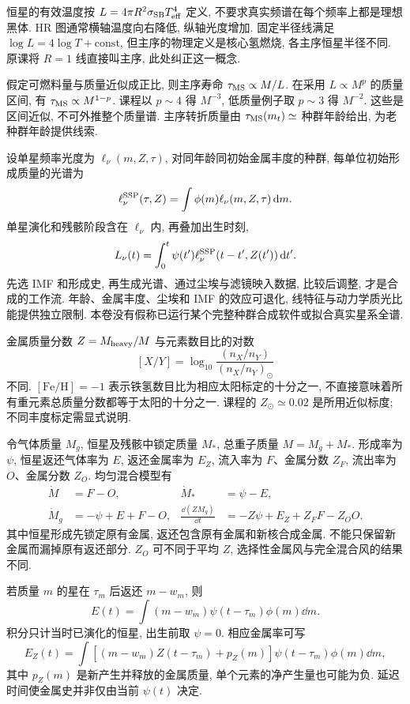 恒星的有效温度按 $L=4\pi R^2\sigma_{\rm SB}T_{\rm eff}^4$ 定义, 不要求真实频谱在每个频率上都是理想黑体. HR 图通常横轴温度向右降低, 纵轴光度增加. 固定半径线满足 $\log L=4\log T+\mathrm{const}$, 但主序的物理定义是核心氢燃烧, 各主序恒星半径不同. 原课将 $R=1$ 线直接叫主序, 此处纠正这一概念.

假定可燃料量与质量近似成正比, 则主序寿命 $\tau_{\rm MS}\propto M/L$. 在采用 $L\propto M^p$ 的质量区间, 有 $\tau_{\rm MS}\propto M^{1-p}$. 课程以 $p\sim4$ 得 $M^{-3}$, 低质量例子取 $p\sim3$ 得 $M^{-2}$. 这些是区间近似, 不可外推整个质量谱. 主序转折质量由 $\tau_{
\rm MS}(m_t)\simeq$ 种群年龄给出, 为老种群年龄提供线索.

设单星频率光度为 $\ell_\nu(m,Z,\tau)$, 对同年龄同初始金属丰度的种群, 每单位初始形成质量的光谱为
\[
\ell_\nu^{\rm SSP}(\tau,Z)=\int\phi(m)\ell_\nu(m,Z,\tau)\,\mathrm d m.
\]
单星演化和残骸阶段含在 $\ell_\nu$ 内, 再叠加出生时刻,
\[
L_\nu(t)=\int_0^t\psi(t')\ell_\nu^{\rm SSP}(t-t',Z(t'))\,\mathrm d t'.
\]
先选 IMF 和形成史, 再生成光谱、通过尘埃与滤镜映入数据, 比较后调整, 才是合成的工作流. 年龄、金属丰度、尘埃和 IMF 的效应可退化, 线特征与动力学质光比能提供独立限制. 本卷没有假称已运行某个完整种群合成软件或拟合真实星系全谱.

金属质量分数 $Z=M_{\rm heavy}/M$ 与元素数目比的对数
\[
[X/Y]=\log_{10}\frac{(n_X/n_Y)}{(n_X/n_Y)_\odot}
\]
不同. $[\mathrm{Fe/H}]=-1$ 表示铁氢数目比为相应太阳标定的十分之一, 不直接意味着所有重元素总质量分数都等于太阳的十分之一. 课程的 $Z_\odot\simeq0.02$ 是所用近似标度; 不同丰度标定需显式说明.

令气体质量 $M_g$, 恒星及残骸中锁定质量 $M_*$, 总重子质量 $M=M_g+M_*$. 形成率为 $\psi$, 恒星返还气体率为 $E$, 返还金属率为 $E_Z$, 流入率为 $F$、金属分数 $Z_F$, 流出率为 $O$、金属分数 $Z_O$. 均匀混合模型有
\begin{align*}
\dot M&=F-O, &\dot M_*&=\psi-E,\\
\dot M_g&=-\psi+E+F-O,
&\frac{\dd(ZM_g)}{\dd t}&=-Z\psi+E_Z+Z_FF-Z_OO.
\end{align*}
其中恒星形成先锁定原有金属, 返还包含原有金属和新核合成金属. 不能只保留新金属而漏掉原有返还部分. $Z_O$ 可不同于平均 $Z$, 选择性金属风与完全混合风的结果不同.

若质量 $m$ 的星在 $\tau_m$ 后返还 $m-w_m$, 则
\[
E(t)=\int(m-w_m)\psi(t-\tau_m)\phi(m)\dd m.
\]
积分只计当时已演化的恒星, 出生前取 $\psi=0$. 相应金属率可写
\[
E_Z(t)=\int\![(m-w_m)Z(t-\tau_m)+p_Z(m)]
\psi(t-\tau_m)\phi(m)\dd m,
\]
其中 $p_Z(m)$ 是新产生并释放的金属质量, 单个元素的净产生量也可能为负. 延迟时间使金属史并非仅由当前 $\psi(t)$ 决定.

